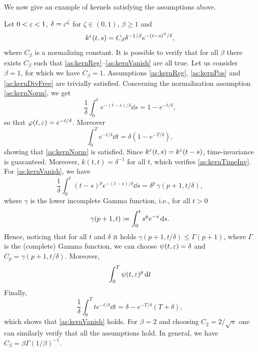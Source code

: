 \documentclass[10pt]{article}
\begin{document}
We now give an example of kernels satisfying the assumptions above.
\begin{example}\label{ex:expKernel} Let $0<\varepsilon<1$, $\delta = \varepsilon^\zeta$ for $\zeta \in (0, 1)$, $\beta \geq 1$ and
	\begin{equation}
		k^\varepsilon(t, s) = C_{\beta} \delta^{-1/\beta} e^{-(t-s)^\beta/\delta},
	\end{equation}
	where $C_{\beta}$ is a normalizing constant. It is possible to verify that for all $\beta$ there exists $C_\beta$ such that \ref{as:kernReg}--\ref{as:kernVanish} are all true. Let us consider $\beta = 1$, for which we have $C_\beta = 1$. Assumptions \ref{as:kernReg}, \ref{as:kernPos} and \ref{as:kernDivFree} are trivially satisfied. Concerning the normalization assumption \ref{as:kernNorm}, we get
	\begin{equation}
		\frac1\delta \int_0^t  e^{-(t-s)/\delta} \dd s = 1 - e^{-t/\delta},
	\end{equation}
	so that $\varphi(t, \varepsilon) = e^{-t/\delta}$. Moreover
	\begin{equation}
		\int_0^T e^{-t / \delta} \dd t = \delta\left(1 - e^{-T/\delta}\right),
	\end{equation}
	showing that \ref{as:kernNorm} is satisfied. Since $k^\varepsilon(t, s) = k^\varepsilon(t-s)$, time-invariance is guaranteed. Moreover, $k(t, t) = \delta^{-1}$ for all $t$, which verifies \ref{as:kernTimeInv}. For \ref{as:kernVanish}, we have
	\begin{equation}
		\frac1\delta \int_0^t (t-s)^p e^{-(t-s)/\delta} \dd s = \delta^p \, \gamma(p+1,t/\delta),
	\end{equation}
	where $\gamma$ is the lower incomplete Gamma function, i.e., for all $t > 0$
	\begin{equation}
		\gamma(p+1, t) \coloneqq \int_0^t s^p e^{-s} \,\mathrm{d} s.
	\end{equation}
	Hence, noticing that for all $t$ and $\delta$ it holds $\gamma(p+1, t/\delta) \leq \Gamma(p+1)$, where $\Gamma$ is the (complete) Gamma function, we can choose $\psi(t, \varepsilon) = \delta$ and $C_p = \gamma(p+1, t/\delta)$. Moreover,
	\begin{equation}
		\int_0^T \psi(t, \varepsilon)^p \,\mathrm{d} t
	\end{equation}
	Finally, 
	\begin{equation}
		\frac1\delta \int_0^T t e^{-t/\delta} \dd t = \delta - e^{-T/\delta}(T + \delta),
	\end{equation}
	which shows that \ref{as:kernVanish} holds.	For $\beta = 2$ and choosing $C_2 = 2/\sqrt{\pi}$ one can similarly verify that all the assumptions hold. In general, we have $C_\beta = \beta\Gamma(1/\beta)^{-1}$.

\end{example}
\end{document}
